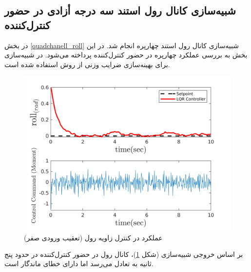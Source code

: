 \subsection{شبیه‌سازی کانال رول استند سه درجه أزادی در حضور کنترل‌کننده }\label{roll_lqr_section_simulation}
در بخش
\ref{quadchanell_roll}
شبیه‌سازی کانال رول استند چهارپره انجام شد. در این بخش به بررسی عملکرد چهارپره در حضور کنترل‌کننده  پرداخته می‌شود. در شبیه‌سازی برای بهینه‌سازی ضرایب وزنی  از روش
 \cite{Karimi2010}
استفاده شده است.
\begin{figure}[H]\label{lqr_roll_figure_simulation}
	\includegraphics[width=12cm]{../Figures/MIL/LQR/Roll/lqr_roll.png}
	\centering
	\caption{عملكرد  در کنترل زاويه رول (تعقیب ورودی صفر)}
\end{figure}
بر اساس خروجی شبیه‌سازی (شکل
\ref{lqr_roll_figure_simulation})،
کانال رول در حضور کنترل‌کننده  در حدود پنج ثانیه به تعادل می‌رسد اما دارای خطای ماندگار است. 